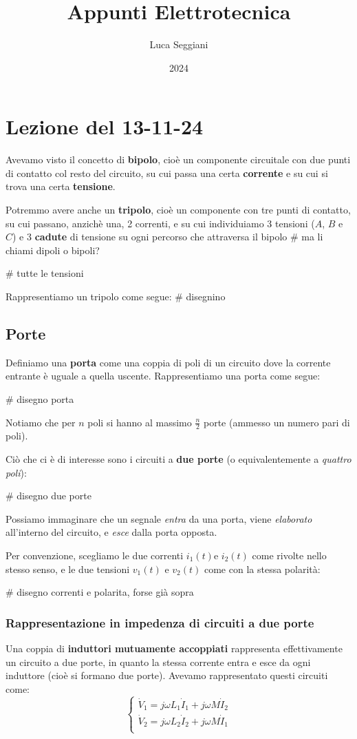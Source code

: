 \documentclass[a4paper,11pt]{article}
\title{Appunti Elettrotecnica}
\author{Luca Seggiani}
\date{2024}
\begin{document}
\section{Lezione del 13-11-24}

\thispagestyle{empty}
\pagestyle{fancy}

Avevamo visto il concetto di \textbf{bipolo}, cioè un componente circuitale con due punti di contatto col resto del circuito, su cui passa una certa \textbf{corrente} e su cui si trova una certa \textbf{tensione}.

Potremmo avere anche un \textbf{tripolo}, cioè un componente con tre punti di contatto, su cui passano, anzichè una, 2 correnti, e su cui individuiamo 3 tensioni ($A$, $B$ e $C$) e 3 \textbf{cadute} di tensione su ogni percorso che attraversa il bipolo # ma li chiami dipoli o bipoli?

# tutte le tensioni

Rappresentiamo un tripolo come segue: # disegnino

\subsection{Porte}
Definiamo una \textbf{porta} come una coppia di poli di un circuito dove la corrente entrante è uguale a quella uscente.
Rappresentiamo una porta come segue:

# disegno porta

Notiamo che per $n$ poli si hanno al massimo $\frac{n}{2}$ porte (ammesso un numero pari di poli).

Ciò che ci è di interesse sono i circuiti a \textbf{due porte} (o equivalentemente a \textit{quattro poli}):

# disegno due porte

Possiamo immaginare che un segnale \textit{entra} da una porta, viene \textit{elaborato} all'interno del circuito, e \textit{esce} dalla porta opposta.

Per convenzione, scegliamo le due correnti $i_1(t)$e $i_2(t)$ come rivolte nello stesso senso, e le due tensioni $v_1(t)$ e $v_2(t)$ come con la stessa polarità:

# disegno correnti e polarita, forse già sopra

\subsubsection{Rappresentazione in impedenza di circuiti a due porte}
Una coppia di \textbf{induttori mutuamente accoppiati} rappresenta effettivamente un circuito a due porte, in quanto la stessa corrente entra e esce da ogni induttore (cioè si formano due porte).
Avevamo rappresentato questi circuiti come:
\[
	\begin{cases}
		\dot{V}_1 = j \omega L_1 \dot{I}_1 + j \omega M \dot{I}_2 \\	
		\dot{V}_2 = j \omega L_2 \dot{I}_2 + j \omega M \dot{I}_1 \\	
	\end{cases}
\]
\end{document}
